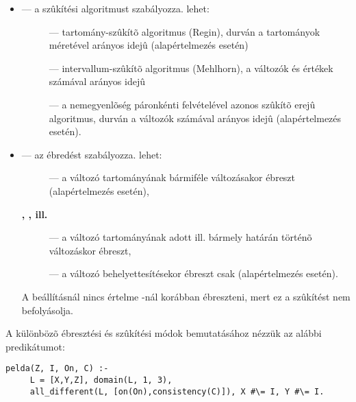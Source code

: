 \begin{itemize}
\item {} --- a szûkítési algoritmust szabályozza.  lehet:
\begin{description}
\item[] --- tartomány-szûkítõ algoritmus (Regin), durván a
tartományok méretével arányos idejû (alapértelmezés  esetén)
\item[] --- intervallum-szûkítõ algoritmus (Mehlhorn), a
változók és értékek számával arányos idejû
\item[] --- a nemegyenlõség páronkénti felvételével azonos
szûkítõ erejû algoritmus, durván a változók számával arányos idejû
(alapértelmezés  esetén).
\end{description}

\item {} --- az ébredést szabályozza.  lehet:
\begin{description}
\item[] --- a változó tartományának bármiféle változásakor
ébreszt (alapértelmezés  esetén),
\item[{\rm \bf {}, , {\rm ill.} }] ---
a változó tartományának adott ill. bármely határán történõ változáskor ébreszt,
\item[] --- a változó behelyettesítésekor ébreszt csak (alapértelmezés
 esetén).
\end{description}

A  beállításnál nincs értelme -nál
korábban ébreszteni, mert ez a szûkítést nem befolyásolja.
\end{itemize}

A különbözõ ébresztési és szûkítési módok bemutatásához nézzük az alábbi predikátumot:

\begin{verbatim}
pelda(Z, I, On, C) :-
     L = [X,Y,Z], domain(L, 1, 3), 
     all_different(L, [on(On),consistency(C)]), X #\= I, Y #\= I.
\end{verbatim}


